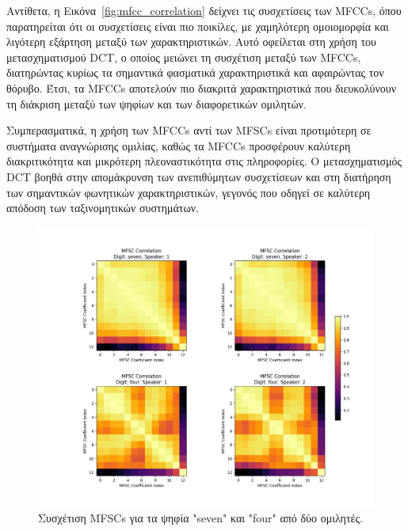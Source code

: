 \documentclass[a4paper,12pt]{article}
\begin{document}
Αντίθετα, η Εικόνα~\ref{fig:mfcc_correlation} δείχνει τις συσχετίσεις των MFCCs, όπου παρατηρείται ότι
οι συσχετίσεις είναι πιο ποικίλες, με χαμηλότερη ομοιομορφία και λιγότερη εξάρτηση μεταξύ των χαρακτηριστικών.
Αυτό οφείλεται στη χρήση του μετασχηματισμού DCT, ο οποίος μειώνει τη συσχέτιση μεταξύ των MFCCs,
διατηρώντας κυρίως τα σημαντικά φασματικά χαρακτηριστικά και αφαιρώντας τον θόρυβο. Έτσι, τα
MFCCs αποτελούν πιο διακριτά χαρακτηριστικά που διευκολύνουν τη διάκριση μεταξύ των ψηφίων και των διαφορετικών ομιλητών.

Συμπερασματικά, η χρήση των MFCCs αντί των MFSCs είναι προτιμότερη σε συστήματα αναγνώρισης ομιλίας,
καθώς τα MFCCs προσφέρουν καλύτερη διακριτικότητα και μικρότερη πλεοναστικότητα στις πληροφορίες.
Ο μετασχηματισμός DCT βοηθά στην απομάκρυνση των ανεπιθύμητων συσχετίσεων και στη διατήρηση των
σημαντικών φωνητικών χαρακτηριστικών, γεγονός που οδηγεί σε καλύτερη απόδοση των ταξινομητικών συστημάτων.

\begin{figure}[h]
    \centering
    \includegraphics[width=\textwidth]{images/corr_mfsc_combined.png}
    \caption{Συσχέτιση MFSCs για τα ψηφία "seven" και "four" από δύο ομιλητές.}
    \label{fig:mfsc_correlation}
\end{figure}
\end{document}
